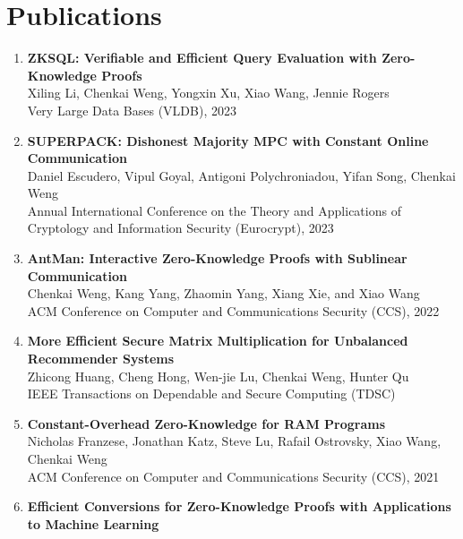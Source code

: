 \documentclass[letterpaper,11pt]{article}
\newcommand{\resumeSubHeadingListStart}{\begin{itemize}[leftmargin=0.15in, label={}]}
\begin{document}
\section{Publications}
\begin{enumerate}[leftmargin=0.20in]
  \item
          {\textbf{\small ZKSQL: Verifiable and Efficient Query Evaluation with Zero-Knowledge Proofs}} \\
		{\small Xiling Li, Chenkai Weng, Yongxin Xu, Xiao Wang, Jennie Rogers \vspace{-2pt}} \\
        {\small Very Large Data Bases (VLDB), 2023}
  \item
          {\textbf{\small SUPERPACK: Dishonest Majority MPC with Constant Online Communication}} \\
		{\small Daniel Escudero, Vipul Goyal, Antigoni Polychroniadou, Yifan Song, Chenkai Weng \vspace{-2pt}} \\
        {\small Annual International Conference on the Theory and Applications of Cryptology and Information Security (Eurocrypt), 2023}
  \item
          {\textbf{\small AntMan: Interactive Zero-Knowledge Proofs with Sublinear Communication}} \\
		{\small Chenkai Weng, Kang Yang, Zhaomin Yang, Xiang Xie, and Xiao Wang \vspace{-2pt}} \\
		{\small ACM Conference on Computer and Communications Security (CCS), 2022}
  \item
          {\textbf{\small More Efficient Secure Matrix Multiplication for Unbalanced Recommender Systems}} \\
		{\small Zhicong Huang, Cheng Hong, Wen-jie Lu, Chenkai Weng, Hunter Qu \vspace{-2pt}} \\
		{\small IEEE Transactions on Dependable and Secure Computing (TDSC)}
  \item
          {\textbf{\small Constant-Overhead Zero-Knowledge for RAM Programs}} \\
		{\small Nicholas Franzese, Jonathan Katz, Steve Lu, Rafail Ostrovsky, Xiao Wang, Chenkai Weng \vspace{-2pt}} \\
		{\small ACM Conference on Computer and Communications Security (CCS), 2021}
  \item
          {\textbf{\small Efficient Conversions for Zero-Knowledge Proofs with Applications to Machine Learning}} \\

\end{enumerate}
\end{document}
